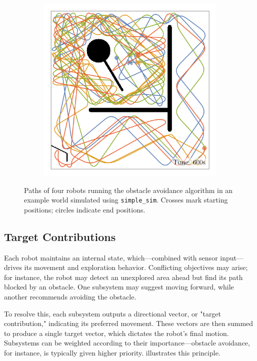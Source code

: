 \begin{figure}[H]
\begin{subfigure}[b]{\w}
    \end{subfigure}
    \begin{subfigure}[b]{\w}
        \centering
        \includegraphics[width=\textwidth]{./figures/plots/paths/avoid-obstacles-paths-(after-600s).png}
    \end{subfigure}
    \caption{Paths of four robots running the obstacle avoidance algorithm in an example world simulated using \texttt{simple\_sim}. Crosses mark starting positions; circles indicate end positions.}
    \label{fig:roomba-paths}
\end{figure}

\subsection{Target Contributions}
Each robot maintains an internal state, which—combined with sensor input—drives its movement and exploration behavior. Conflicting objectives may arise; for instance, the robot may detect an unexplored area ahead but find its path blocked by an obstacle. One subsystem may suggest moving forward, while another recommends avoiding the obstacle.

To resolve this, each subsystem outputs a directional vector, or "target contribution," indicating its preferred movement. These vectors are then summed to produce a single target vector, which dictates the robot’s final motion. Subsystems can be weighted according to their importance—obstacle avoidance, for instance, is typically given higher priority.  illustrates this principle.

